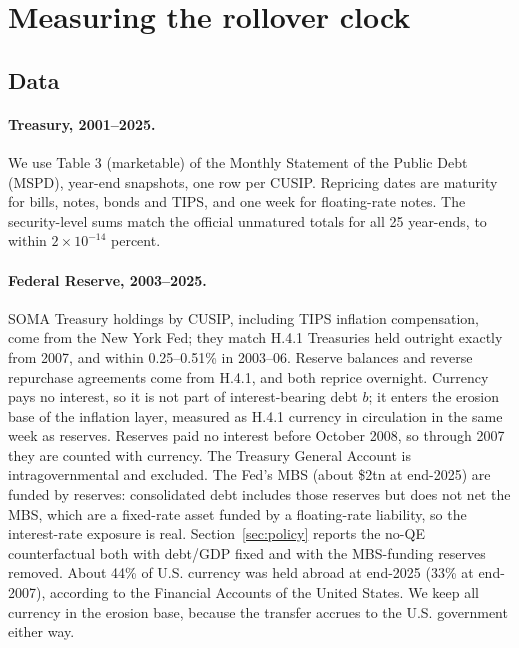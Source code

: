\section{Measuring the rollover clock}\label{sec:measurement}

\subsection{Data}\label{sec:data}

\paragraph{Treasury, 2001--2025.} We use Table 3 (marketable) of the Monthly Statement of the Public Debt (MSPD), year-end snapshots, one row per CUSIP. Repricing dates are maturity for bills, notes, bonds and TIPS, and one week for floating-rate notes. The security-level sums match the official unmatured totals for all 25 year-ends, to within $2\times10^{-14}$ percent.

\paragraph{Federal Reserve, 2003--2025.} SOMA Treasury holdings by CUSIP, including TIPS inflation compensation, come from the New York Fed; they match H.4.1 Treasuries held outright exactly from 2007, and within 0.25--0.51\% in 2003--06. Reserve balances and reverse repurchase agreements come from H.4.1, and both reprice overnight. Currency pays no interest, so it is not part of interest-bearing debt $b$; it enters the erosion base of the inflation layer, measured as H.4.1 currency in circulation in the same week as reserves. Reserves paid no interest before October 2008, so through 2007 they are counted with currency. The Treasury General Account is intragovernmental and excluded. The Fed's MBS (about \$2tn at end-2025) are funded by reserves: consolidated debt includes those reserves but does not net the MBS, which are a fixed-rate asset funded by a floating-rate liability, so the interest-rate exposure is real. Section~\ref{sec:policy} reports the no-QE counterfactual both with debt/GDP fixed and with the MBS-funding reserves removed. About 44\% of U.S. currency was held abroad at end-2025 (33\% at end-2007), according to the Financial Accounts of the United States. We keep all currency in the erosion base, because the transfer accrues to the U.S. government either way.

